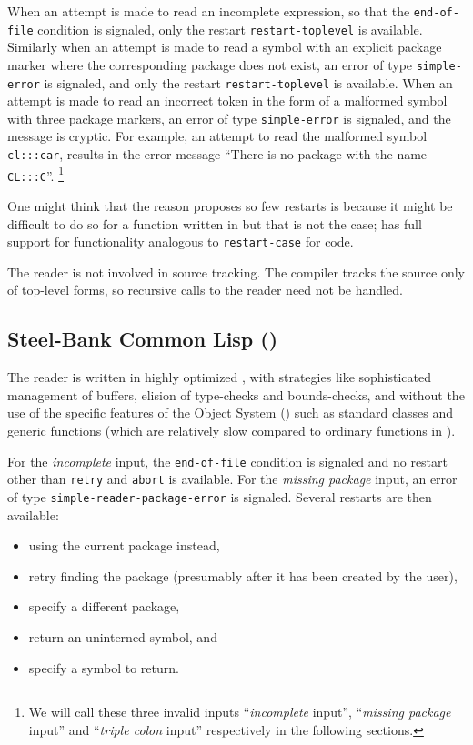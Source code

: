 When an attempt is made to read an incomplete expression, so that the
\texttt{end-of-file} condition is signaled, only the restart
\texttt{restart-toplevel} is available.  Similarly when an attempt is
made to read a symbol with an explicit package marker where the
corresponding package does not exist, an error of type
\texttt{simple-error} is signaled, and only the restart
\texttt{restart-toplevel} is available.  When an attempt is made to
read an incorrect token in the form of a malformed symbol with three
package markers, an error of type \texttt{simple-error} is signaled,
and the message is cryptic.  For example, an attempt to read the
malformed symbol \texttt{cl:::car}, results in the error message
``There is no package with the name \texttt{CL:::C}''.%
\footnote{We will call these three invalid inputs ``\emph{incomplete}
  input'', ``\emph{missing package} input'' and ``\emph{triple colon}
  input'' respectively in the following sections.}

One might think that the reason \ecl{} proposes so few restarts is
because it might be difficult to do so for a function written in
\clanguage{} but that is not the case; \ecl{} has full support for
functionality analogous to \texttt{restart-case} for \clanguage{}
code.

The \ecl{} reader is not involved in source tracking.  The compiler
tracks the source only of top-level forms, so recursive calls to the
reader need not be handled.

\subsection{Steel-Bank Common Lisp (\sbcl{})}

The \sbcl{} reader is written in highly optimized \cl{}, with
strategies like sophisticated management of buffers, elision of
type-checks and bounds-checks, and without the use of the specific
features of the \cl{} Object System (\clos{}) such as standard classes
and generic functions (which are relatively slow compared to ordinary
functions in \sbcl{}).

For the \emph{incomplete} input, the \texttt{end-of-file} condition is
signaled and no restart other than \texttt{retry} and \texttt{abort}
is available.  For the \emph{missing package} input, an error of type
\texttt{simple-reader-package-error} is signaled.  Several restarts
are then available:

\begin{itemize}
\item using the current package instead,
\item retry finding the package (presumably after it has been created
  by the user),
\item specify a different package,
\item return an uninterned symbol, and
\item specify a symbol to return.
\end{itemize}

